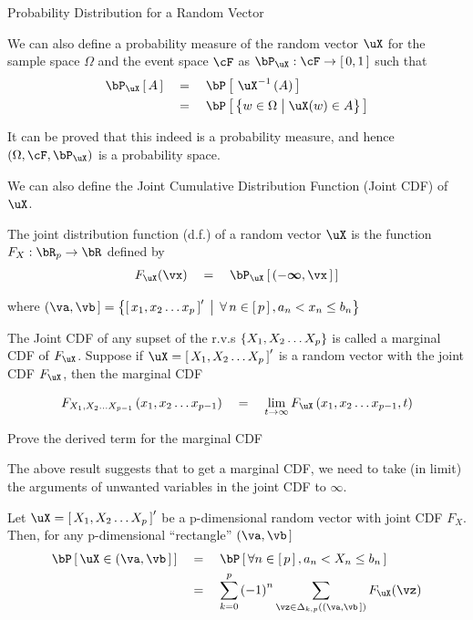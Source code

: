 \documentclass{article}
\begin{document}
\begin{ssection}{Probability Distribution for a Random Vector}

	We can also define a probability measure of the random vector $\uX$ for the sample space $\Omega$ and the event space $\cF$ as $\bP_\uX : \cF \ra \brac{0, 1}$ such that
	\begin{align*}
		\prob[\uX]{A}	&\eq	\prob{\funcinv{\uX}{A}} \\
						&\eq	\prob{\set{w \in \Omega \pipe \uX(w) \in A}}
	\end{align*}

	It can be proved that this indeed is a probability measure, and hence $\para{\Omega, \cF, \bP_\uX}$ is a probability space. \br

	We can also define the Joint Cumulative Distribution Function (Joint CDF) of $\uX$.

	\begin{definition}
		The joint distribution function (d.f.) of a random vector $\uX$ is the function $F_X : \bR_p \ra \bR$ defined by
		\begin{align*}
			F_\uX(\vx)	\eq	\prob[\uX]{(-\bm{\infty}, \vx\,]}
		\end{align*}

		where $(\va, \vb\,] = \set{\brac{x_1, x_2 \dots x_p}' \pipe \qforall n \in \brac{p}, a_n < x_n \le b_n}$
	\end{definition}

	\begin{definition}
		The Joint CDF of any supset of the r.v.s $\left\{ {X_1, X_2 \dots X_p} \right\}$ is called a marginal CDF of $F_\uX$. Suppose if $\uX = \brac{X_1, X_2 \dots X_p}'$ is a random vector with the joint CDF $F_\uX$, then the marginal CDF

		\begin{align*}
			F_{X_1, X_2 \dots X_{p-1}}\para{x_1, x_2 \dots x_{p-1}}	\eq	\lim_{t \ra \infty} F_{\uX}\para{x_1, x_2 \dots x_{p-1}, t}
		\end{align*}
	\end{definition}

	\begin{exercise}
		Prove the derived term for the marginal CDF
	\end{exercise}

	The above result suggests that to get a marginal CDF, we need to take (in limit) the arguments of unwanted variables in the joint CDF to $\infty$.

	\begin{result}
		Let $\uX = \brac{X_1, X_2 \dots X_p}'$ be a p-dimensional random vector with joint CDF $F_X$. Then, for any p-dimensional ``rectangle'' $(\va, \vb\,]$
		\begin{align*}
			\prob{\uX \in (\va, \vb\,]}	&\eq	\prob{\forall n \in \brac{p}, a_n < X_n \le b_n} \\
			&\eq	\sum_{k = 0}^p \para{-1}^n \sum_{\vz \in \Delta_{k, p} \para{(\va, \vb\,]}} F_\uX (\vz)
		\end{align*}


\end{result}
\end{ssection}
\end{document}
